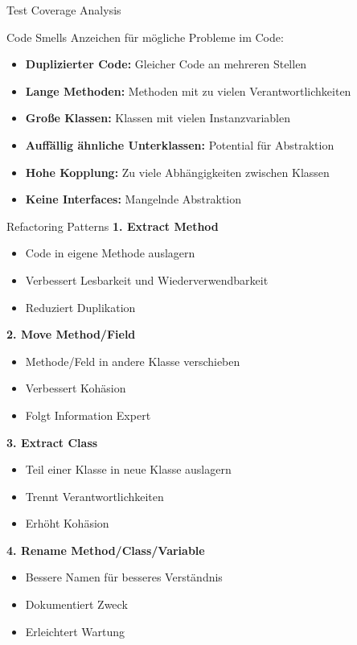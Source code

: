 \begin{example2}{Test Coverage Analysis}
\begin{definition}{Code Smells}
Anzeichen für mögliche Probleme im Code:
\begin{itemize}
    \item \textbf{Duplizierter Code:} Gleicher Code an mehreren Stellen
    \item \textbf{Lange Methoden:} Methoden mit zu vielen Verantwortlichkeiten
    \item \textbf{Große Klassen:} Klassen mit vielen Instanzvariablen
    \item \textbf{Auffällig ähnliche Unterklassen:} Potential für Abstraktion
    \item \textbf{Hohe Kopplung:} Zu viele Abhängigkeiten zwischen Klassen
    \item \textbf{Keine Interfaces:} Mangelnde Abstraktion
\end{itemize}
\end{definition}

\begin{KR}{Refactoring Patterns}
\textbf{1. Extract Method}
\begin{itemize}
    \item Code in eigene Methode auslagern
    \item Verbessert Lesbarkeit und Wiederverwendbarkeit
    \item Reduziert Duplikation
\end{itemize}

\textbf{2. Move Method/Field}
\begin{itemize}
    \item Methode/Feld in andere Klasse verschieben 
    \item Verbessert Kohäsion
    \item Folgt Information Expert
\end{itemize}

\textbf{3. Extract Class}
\begin{itemize}
    \item Teil einer Klasse in neue Klasse auslagern
    \item Trennt Verantwortlichkeiten
    \item Erhöht Kohäsion
\end{itemize}

\textbf{4. Rename Method/Class/Variable}
\begin{itemize}
    \item Bessere Namen für besseres Verständnis
    \item Dokumentiert Zweck
    \item Erleichtert Wartung
\end{itemize}
\end{KR}


\end{example2}
